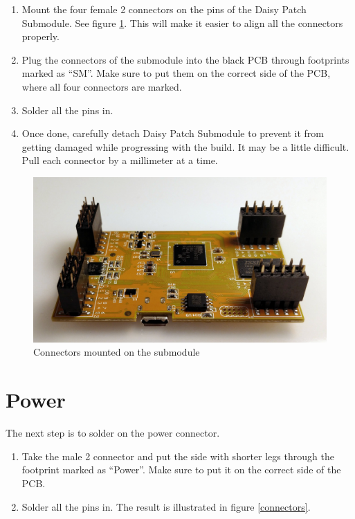 \documentclass[10pt,a4paper,twocolumn]{article}
\begin{document}
\begin{enumerate}
  \item Mount the four female 2 connectors on the pins of the Daisy Patch Submodule. See figure \ref{daisy}. This will make it easier to align all the connectors properly.
  \item Plug the connectors of the submodule into the black PCB through footprints marked as ``SM''. Make sure to put them on the correct side of the PCB, where all four connectors are marked.
  \item Solder all the pins in.
  \item Once done, carefully detach Daisy Patch Submodule to prevent it from getting damaged while progressing with the build. It may be a little difficult. Pull each connector by a millimeter at a time.
\end{enumerate}

\begin{figure}[p]
  \centering
  \includegraphics[width=\linewidth]{p02.jpg}
  \caption{Connectors mounted on the submodule}
  \label{daisy}
\end{figure}

\section{Power}

The next step is to solder on the power connector.

\begin{enumerate}
  \item Take the male 2 connector and put the side with shorter legs through the footprint marked as ``Power''. Make sure to put it on the correct side of the PCB.
  \item Solder all the pins in. The result is illustrated in figure \ref{connectors}.
\end{enumerate}
\end{document}
